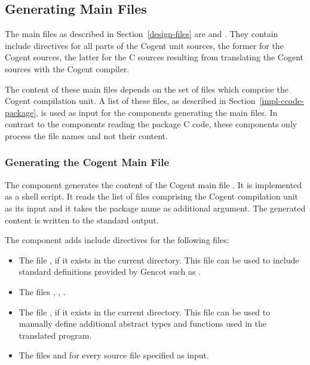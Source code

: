 \subsection{Generating Main Files}
\label{impl-ocomps-main}

The main files as described in Section~\ref{design-files} are  and . They
contain include directives for all parts of the Cogent unit sources, the former for the Cogent sources, the latter 
for the C sources resulting from translating the Cogent sources with the Cogent compiler.

The content of these main files depends on the set of  files which comprise the Cogent compilation unit.
A list of these files, as described in Section~\ref{impl-ccode-package}, is used as input for the components generating
the main files. In contrast to the components reading the package C code, these components only process the file 
names and not their content. 

\subsubsection{Generating the Cogent Main File}

The component  generates the content of the Cogent main file . 
It is implemented as a shell script. It reads the list of
 files comprising the Cogent compilation unit as its input and it takes the package name 
as additional argument. The generated content is written to the standard output. 

The component adds include directives for the following files:
\begin{itemize}
\item The file , if it exists in the current directory. This file can be used to include standard 
definitions provided by Gencot such as .
\item The files , , .
\item The file , if it exists in the current directory. This file can be used to
manually define additional abstract types and functions used in the translated program.
\item The files  and  for every source file  specified as input.
\end{itemize}

